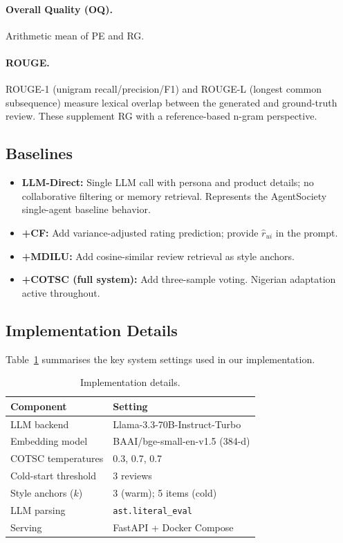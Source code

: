 \documentclass[11pt]{article}
\begin{document}
\paragraph{Overall Quality (OQ).} Arithmetic mean of PE and RG.

\paragraph{ROUGE.}
ROUGE-1 (unigram recall/precision/F1) and ROUGE-L (longest common subsequence)
measure lexical overlap between the generated and ground-truth review.
These supplement RG with a reference-based n-gram perspective.

\subsection{Baselines}

\begin{itemize}
  \item \textbf{LLM-Direct:} Single LLM call with persona and product details;
    no collaborative filtering or memory retrieval.
    Represents the AgentSociety single-agent baseline behavior.
  \item \textbf{+CF:} Add variance-adjusted rating prediction; provide
    $\hat{r}_{ui}$ in the prompt.
  \item \textbf{+MDILU:} Add cosine-similar review retrieval as style anchors.
  \item \textbf{+COTSC (full system):} Add three-sample voting.
    Nigerian adaptation active throughout.
\end{itemize}
\subsection{Implementation Details}
Table~\ref{tab:impl} summarises the key system settings used in our implementation.

\begin{table}[H]
\centering
\begin{tabular}{l p{}}
\toprule
\textbf{Component} & \textbf{Setting} \\
\midrule
LLM backend            & Llama-3.3-70B-Instruct-Turbo \\
Embedding model        & BAAI/bge-small-en-v1.5 (384-d) \\
COTSC temperatures     & 0.3, 0.7, 0.7 \\
Cold-start threshold   & 3 reviews \\
Style anchors ($k$)    & 3 (warm); 5 items (cold) \\
LLM parsing            & \texttt{ast.literal\_eval} \\
Serving                & FastAPI + Docker Compose \\
\bottomrule
\end{tabular}
\caption{Implementation details.}
\label{tab:impl}
\end{table}
\end{document}
